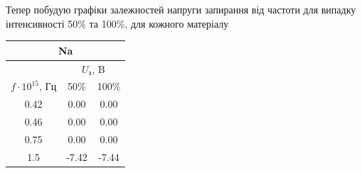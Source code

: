 \documentclass[a4paper,14pt]{extreport}
\begin{document}
			Тепер побудую графіки залежностей напруги запирання від частоти для випадку інтенсивності 50\% та 100\%, для кожного матеріалу	

	
			
		
	\begin{center}

	\begin{minipage}{0.4\textwidth}
			\begin{center}
				\begin{tabular}{|c|c|c|}
					\hline
					\multicolumn{3}{|c|}{Na} \\ \hline
					 & \multicolumn{2}{c|}{$U_{\text{з}}$, B} \\ \cline{2-3} 
					\multirow{-2}{*}{$f\cdot 10^{15}$, Гц} & 50\% & 100\% \\ \hline
					0.42 & 0.00 & 0.00 \\ \hline
					0.46 & 0.00 & 0.00 \\ \hline
					0.75 & 0.00 & 0.00 \\ \hline
					1.5 & -7.42 & -7.44 \\ \hline
				\end{tabular}
			\end{center}
		\end{minipage}
		\hfill
		\begin{minipage}{0.4\textwidth}
	\end{minipage}
	

\end{center}
\end{document}
